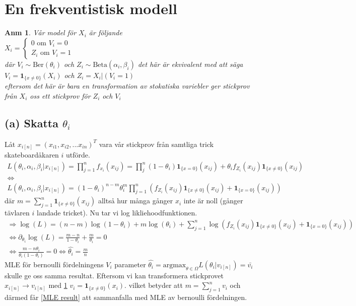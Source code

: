 \documentclass{assignment}
\newcommand{\indicator}[1]{\mathbf{1}_{\{#1\}}}
\newtheorem{anm}{Anm}
\begin{document}
\newpage
\section{En frekventistisk modell}
\begin{anm} \label{properties}
    Vår model för $X_i$ är följande 
    \\ $X_i = \left\{\begin{matrix}
        0 \text{ om } V_i=0
        \\ Z_i \text{ om } V_i=1
    \end{matrix}\right.$
    \\ där $V_i \sim \text{Ber}(\theta_i)$ och $Z_i\sim \text{Beta}(\alpha_i,\beta_i)$ det här är ekvivalent med att säga
    \\ $V_i = \indicator{x\neq0}(X_i)$ och $Z_i= X_i|(V_i=1)$ 
    \\ eftersom det här är bara en transformation av stokatiska variebler ger stickprov från $X_i$ oss ett stickprov för $Z_i$ och $V_i$
\end{anm}

\subsection*{(a) Skatta $\theta_{i}$}

Låt $x_{i[n]} = (x_{i1},x_{i2},...x_{in})^T$ vara vår stickprov från samtliga trick skateboardåkaren $i$ utförde.
\begin{align}
    L(\theta_{i},\alpha_{i},\beta_{i}|x_{i[n]}) = \prod_{j=1}^nf_{x_{i}}(x_{ij}) = \prod_{j}^n (1-\theta_i) \indicator{x=0} (x_{ij}) + \theta_if_{Z_i}(x_{ij})\indicator{x\neq0}(x_{ij})
    \\ \Longleftrightarrow \nonumber
    \\ L(\theta_{i},\alpha_{i},\beta_{i}|x_{i[n]}) = (1-\theta_i)^{n-m}\theta_i^{m}\prod_{j=1}^n\left(f_{Z_i}(x_{ij})\indicator{x\neq0}(x_{ij}) + \indicator{x=0}(x_{ij})\right) 
\end{align}
där $m=\sum_{j=1}^n \indicator{x\neq0}(x_{ij})$ alltså hur många gånger $x_{i}$ inte är noll (gånger tävlaren $i$ landade tricket).
Nu tar vi log likliehoodfunktionen.
\begin{align}
    \Longrightarrow \log(L) = (n-m)\log(1-\theta_i)+m\log(\theta_i)+ \sum_{j=1}^n \log \left(f_{Z_i}(x_{ij})\indicator{x\neq0}(x_{ij}) + \indicator{x=0}(x_{ij})\right) \label{loglike}
    \\ \Longleftrightarrow \partial_{\theta_i}\log(L) = \frac{m-n}{1-\theta_i} + \frac{m}{\theta_i} = 0 \label{blah}
    \\ \Longleftrightarrow \frac{m-n\theta_i}{\theta_i(1-\theta_i)} = 0 \Longleftrightarrow \hat{\theta_i} = \frac{m}{n} \label{MLE result}
\end{align}
MLE för bernoulli fördelningens $V_i$ parameter $\hat{\theta_i} = \text{argmax}_{\theta\in\Omega} L(\theta_i|v_{i[n]}) = \bar{v_i}$ skulle ge oss samma resultat. Eftersom vi kan transformera stickprovet $x_{i[n]}\rightarrow v_{i[n]}$ med \cref{properties} $v_i=\indicator{x\neq0}(x_i)$.
vilket betyder att $m=\sum_{j=1}^n v_i$ och därmed får \cref{MLE result} att sammanfalla med MLE av bernoulli fördelningen. 
\end{document}
